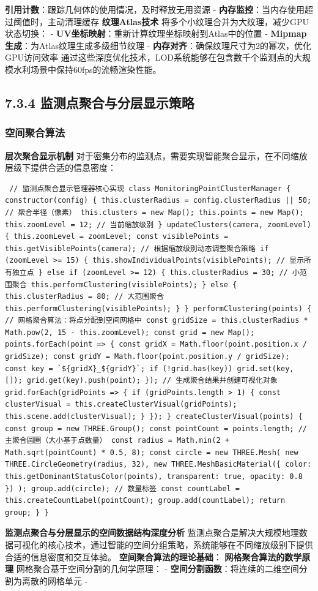 \textbf{引用计数}：跟踪几何体的使用情况，及时释放无用资源 - \textbf{内存监控}：当内存使用超过阈值时，主动清理缓存 \textbf{纹理Atlas技术} 将多个小纹理合并为大纹理，减少GPU状态切换： - \textbf{UV坐标映射}：重新计算纹理坐标映射到Atlas中的位置 - \textbf{Mipmap生成}：为Atlas纹理生成多级细节纹理 - \textbf{内存对齐}：确保纹理尺寸为2的幂次，优化GPU访问效率 通过这些深度优化技术，LOD系统能够在包含数千个监测点的大规模水利场景中保持60fps的流畅渲染性能。 \subsection{7.3.4 监测点聚合与分层显示策略}\label{ux76d1ux6d4bux70b9ux805aux5408ux4e0eux5206ux5c42ux663eux793aux7b56ux7565} \subsubsection{空间聚合算法}\label{ux7a7aux95f4ux805aux5408ux7b97ux6cd5} \textbf{层次聚合显示机制} 对于密集分布的监测点，需要实现智能聚合显示，在不同缩放层级下提供合适的信息密度： \begin{verbatim} // 监测点聚合显示管理器核心实现 class MonitoringPointClusterManager { constructor(config) { this.clusterRadius = config.clusterRadius || 50; // 聚合半径（像素） this.clusters = new Map(); this.points = new Map(); this.zoomLevel = 12; // 当前缩放级别 } updateClusters(camera, zoomLevel) { this.zoomLevel = zoomLevel; const visiblePoints = this.getVisiblePoints(camera); // 根据缩放级别动态调整聚合策略 if (zoomLevel >= 15) { this.showIndividualPoints(visiblePoints); // 显示所有独立点 } else if (zoomLevel >= 12) { this.clusterRadius = 30; // 小范围聚合 this.performClustering(visiblePoints); } else { this.clusterRadius = 80; // 大范围聚合 this.performClustering(visiblePoints); } } performClustering(points) { // 网格聚合算法：将点分配到空间网格中 const gridSize = this.clusterRadius * Math.pow(2, 15 - this.zoomLevel); const grid = new Map(); points.forEach(point => { const gridX = Math.floor(point.position.x / gridSize); const gridY = Math.floor(point.position.y / gridSize); const key = `${gridX}_${gridY}`; if (!grid.has(key)) grid.set(key, []); grid.get(key).push(point); }); // 生成聚合结果并创建可视化对象 grid.forEach(gridPoints => { if (gridPoints.length > 1) { const clusterVisual = this.createClusterVisual(gridPoints); this.scene.add(clusterVisual); } }); } createClusterVisual(points) { const group = new THREE.Group(); const pointCount = points.length; // 主聚合圆圈（大小基于点数量） const radius = Math.min(2 + Math.sqrt(pointCount) * 0.5, 8); const circle = new THREE.Mesh( new THREE.CircleGeometry(radius, 32), new THREE.MeshBasicMaterial({ color: this.getDominantStatusColor(points), transparent: true, opacity: 0.8 }) ); group.add(circle); // 数量标签 const countLabel = this.createCountLabel(pointCount); group.add(countLabel); return group; } } \end{verbatim} \textbf{监测点聚合与分层显示的空间数据结构深度分析} 监测点聚合是解决大规模地理数据可视化的核心技术，通过智能的空间分组策略，系统能够在不同缩放级别下提供合适的信息密度和交互体验。 \textbf{空间聚合算法的理论基础}： \textbf{网格聚合算法的数学原理} 网格聚合基于空间分割的几何学原理： - \textbf{空间分割函数}：将连续的二维空间分割为离散的网格单元 - 